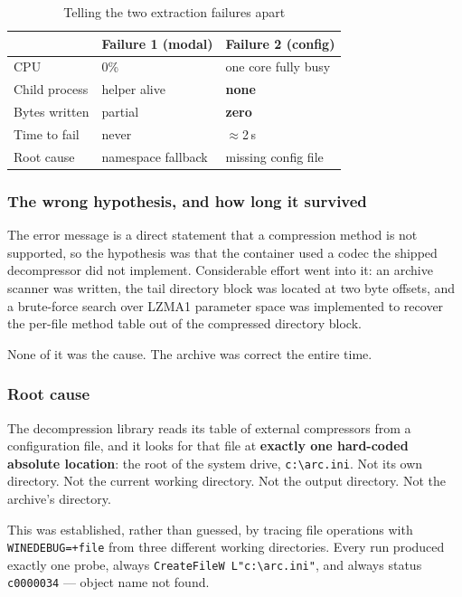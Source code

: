 \begin{table}[htbp]
\caption{Telling the two extraction failures apart}
\label{tab:diff}
\centering
\footnotesize
\begin{tabularx}{\columnwidth}{@{}L{1.9cm}XX@{}}
\toprule
& \textbf{Failure 1 (modal)} & \textbf{Failure 2 (config)} \\
\midrule
CPU & 0\% & one core fully busy \\
Child process & helper alive & \textbf{none} \\
Bytes written & partial & \textbf{zero} \\
Time to fail & never & $\approx$2\,s \\
Root cause & namespace fallback & missing config file \\
\bottomrule
\end{tabularx}
\end{table}

\subsubsection{The wrong hypothesis, and how long it survived}

The error message is a direct statement that a compression method is not
supported, so the hypothesis was that the container used a codec the shipped
decompressor did not implement. Considerable effort went into it: an archive
scanner was written, the tail directory block was located at two byte offsets,
and a brute-force search over LZMA1 parameter space was implemented to recover
the per-file method table out of the compressed directory block.

None of it was the cause. The archive was correct the entire time.

\subsubsection{Root cause}

The decompression library reads its table of external compressors from a
configuration file, and it looks for that file at \textbf{exactly one hard-coded
absolute location}: the root of the system drive, \verb|c:\arc.ini|. Not its own
directory. Not the current working directory. Not the output directory. Not the
archive's directory.

This was established, rather than guessed, by tracing file operations with
\verb|WINEDEBUG=+file| from three different working directories. Every run
produced exactly one probe, always \verb|CreateFileW L"c:\arc.ini"|, and always
status \verb|c0000034| --- object name not found.

